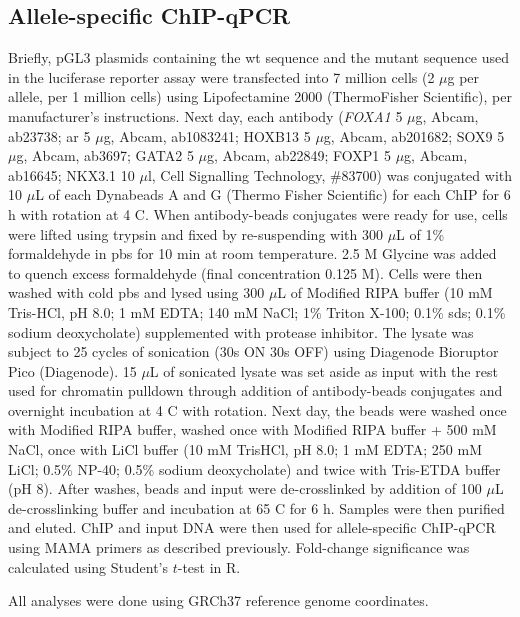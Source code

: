 \subsection{Allele-specific ChIP-qPCR}

Briefly, pGL3 plasmids containing the \gls{wt} sequence and the mutant sequence used in the luciferase reporter assay were transfected into 7 million cells (2 $\mu$g per allele, per 1 million cells) using Lipofectamine 2000 (ThermoFisher Scientific), per manufacturer's instructions.
Next day, each antibody (\emph{FOXA1} 5 $\mu$g, Abcam, ab23738; \gls{ar} 5 $\mu$g, Abcam, ab1083241; HOXB13 5 $\mu$g, Abcam, ab201682; SOX9 5 $\mu$g, Abcam, ab3697; GATA2 5 $\mu$g, Abcam, ab22849; FOXP1 5 $\mu$g, Abcam, ab16645; NKX3.1 10 $\mu$l, Cell Signalling Technology, \#83700) was conjugated with 10 $\mu$L of each Dynabeads A and G (Thermo Fisher Scientific) for each ChIP for 6 h with rotation at 4 \textdegree C.
When antibody-beads conjugates were ready for use, cells were lifted using trypsin and fixed by re-suspending with 300 $\mu$L of 1\% formaldehyde in \gls{pbs} for 10 min at room temperature.
2.5 M Glycine was added to quench excess formaldehyde (final concentration 0.125 M).
Cells were then washed with cold \gls{pbs} and lysed using 300 $\mu$L of Modified RIPA buffer (10 mM Tris-HCl, pH 8.0; 1 mM EDTA; 140 mM NaCl; 1\% Triton X-100; 0.1\% \gls{sds}; 0.1\% sodium deoxycholate) supplemented with protease inhibitor.
The lysate was subject to 25 cycles of sonication (30s ON 30s OFF) using Diagenode Bioruptor Pico (Diagenode).
15 $\mu$L of sonicated lysate was set aside as input with the rest used for chromatin pulldown through addition of antibody-beads conjugates and overnight incubation at 4 \textdegree C with rotation.
Next day, the beads were washed once with Modified RIPA buffer, washed once with Modified RIPA buffer + 500 mM NaCl, once with LiCl buffer (10 mM TrisHCl, pH 8.0; 1 mM EDTA; 250 mM LiCl; 0.5\% NP-40; 0.5\% sodium deoxycholate) and twice with Tris-ETDA buffer (pH 8).
After washes, beads and input were de-crosslinked by addition of 100 $\mu$L de-crosslinking buffer and incubation at 65 \textdegree C for 6 h.
Samples were then purified and eluted.
ChIP and input DNA were then used for allele-specific ChIP-qPCR using MAMA primers as described previously.
Fold-change significance was calculated using Student's $t$-test in R.

All analyses were done using GRCh37 \cite{internationalhumangenomesequencingconsortiumFinishingEuchromaticSequence2004} reference genome coordinates.
